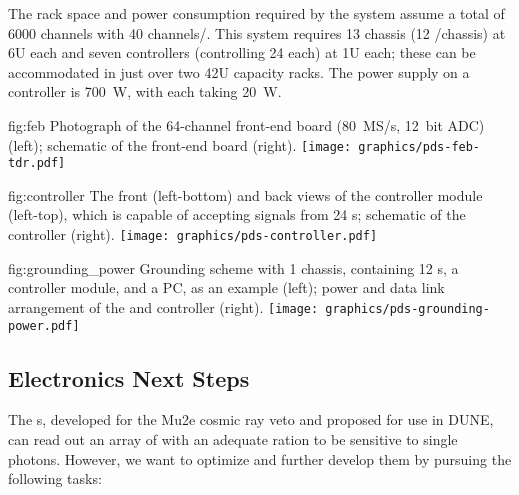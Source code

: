 The rack space and power consumption required by the system assume
a total of 6000 channels with 40 channels/. This system requires 13 chassis (12 /chassis) at 6U each and seven controllers (controlling 24  each) at 1U each; these can be accommodated in just over two 42U capacity racks. The power supply on a controller is \SI{700}{W}, with each  taking \SI{20}{W}. 
 

\begin{dunefigure}
 {fig:feb}
 {Photograph of the 64-channel  front-end board (\SI{80}{MS/s}, \SI{12}{bit} ADC) (left); schematic of the front-end board (right).}
\texttt{[image: graphics/pds-feb-tdr.pdf]} 
\vspace{-6.3cm}
\end{dunefigure}

\begin{dunefigure}
 {fig:controller}
 {The front (left-bottom) and back views of the controller module (left-top), which is capable of accepting signals from 24 s; schematic of the controller (right).}
\texttt{[image: graphics/pds-controller.pdf]} 
\vspace{-5.5cm}
\end{dunefigure}

\begin{dunefigure}
 {fig:grounding_power}
 {Grounding scheme with 1 chassis, containing 12 s, a controller module, and a  PC, as an example (left); power and data link arrangement of the  and controller (right).}
\texttt{[image: graphics/pds-grounding-power.pdf]} 
\vspace{-7.1cm}
\end{dunefigure}

\subsection{Electronics Next Steps}
\label{subsec:pds-fe-next}

The s, developed for the Mu2e cosmic ray veto and proposed for use in DUNE, can read out an array of  with an adequate  ration to be sensitive to single photons. However, we want to optimize and further develop them by pursuing the following tasks:

